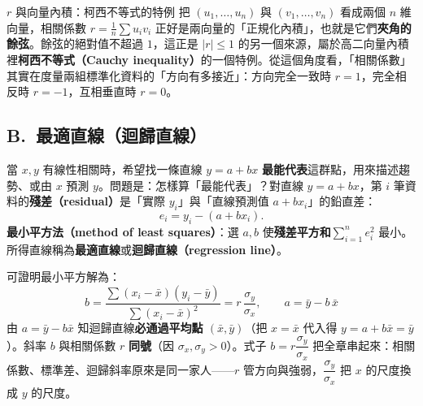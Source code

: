\documentclass[11pt]{article}
\begin{document}
\begin{延伸框}{$r$ 與向量內積：柯西不等式的特例}
把 $(u_1,\dots,u_n)$ 與 $(v_1,\dots,v_n)$ 看成兩個 $n$ 維向量，相關係數 $r=\frac1n\sum u_iv_i$ 正好是兩向量的「正規化內積」，也就是它們\textbf{夾角的餘弦}。餘弦的絕對值不超過 $1$，這正是 $|r|\le1$ 的另一個來源，屬於高二向量內積裡\textbf{柯西不等式（Cauchy inequality）}的一個特例。從這個角度看，「相關係數」其實在度量兩組標準化資料的「方向有多接近」：方向完全一致時 $r=1$，完全相反時 $r=-1$，互相垂直時 $r=0$。
\end{延伸框}

\subsection*{\sffamily B.\ 最適直線（迴歸直線）}

當 $x,y$ 有線性相關時，希望找一條直線 $y = a + bx$ \textbf{最能代表}這群點，用來描述趨勢、或由 $x$ 預測 $y$。問題是：怎樣算「最能代表」？對直線 $y=a+bx$，第 $i$ 筆資料的\textbf{殘差（residual）}是「實際 $y_i$」與「直線預測值 $a+bx_i$」的鉛直差：
$$e_i = y_i - (a+bx_i).$$
\textbf{最小平方法（method of least squares）}：選 $a,b$ 使\textbf{殘差平方和}$\displaystyle\sum_{i=1}^{n} e_i^2$ 最小。所得直線稱為\textbf{最適直線}或\textbf{迴歸直線（regression line）}。


可證明最小平方解為：
$$\boxed{\;b = \frac{\sum (x_i-\bar{x})(y_i-\bar{y})}{\sum (x_i-\bar{x})^2} = r\,\frac{\sigma_y}{\sigma_x},\qquad a = \bar{y} - b\,\bar{x}\;}$$
由 $a=\bar y - b\bar x$ 知迴歸直線\textbf{必通過平均點 $(\bar{x},\bar{y})$}（把 $x=\bar x$ 代入得 $y=a+b\bar x=\bar y$）。斜率 $b$ 與相關係數 $r$ \textbf{同號}（因 $\sigma_x,\sigma_y>0$）。式子 $b=r\dfrac{\sigma_y}{\sigma_x}$ 把全章串起來：相關係數、標準差、迴歸斜率原來是同一家人——$r$ 管方向與強弱，$\dfrac{\sigma_y}{\sigma_x}$ 把 $x$ 的尺度換成 $y$ 的尺度。
\end{document}
